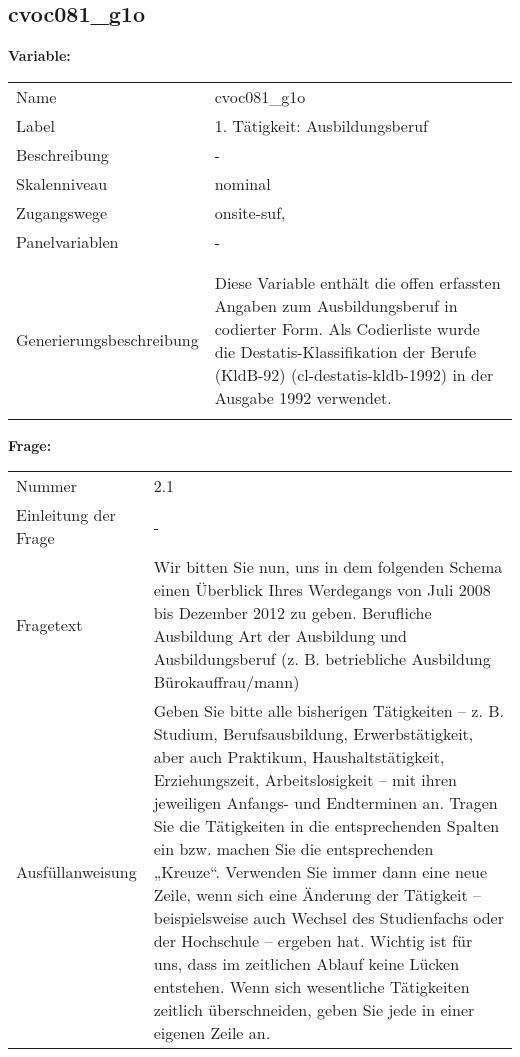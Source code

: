 	
	
	\subsection{cvoc081\_g1o}
	\label{subSection:cvoc081_g1o}

	\noindent\textbf{Variable:}\\
		\begin{tabular}{lL{11.3cm}}
			\label{tableVariable:cvoc081_g1o}
			Name & cvoc081\_g1o \\
			Label & 1. Tätigkeit: Ausbildungsberuf \\
			Beschreibung & - \\
			Skalenniveau & nominal \\
			Zugangswege &
				onsite-suf,
 \\
			Panelvariablen & -
			 \\
			 \\
 \\
					Generierungsbeschreibung & Diese Variable enthält die offen erfassten Angaben zum Ausbildungsberuf in codierter Form. Als Codierliste wurde die Destatis-Klassifikation der Berufe (KldB-92) (cl-destatis-kldb-1992) in der Ausgabe 1992 verwendet. 
				 \\	
			 \\
		\end{tabular}

		\vspace*{1 cm}
		\noindent\textbf{Frage:}\\
		\begin{tabular}{lL{11.3cm}}
			\label{tableQuestion:cvoc081_g1o}
			Nummer & 2.1 \\
			Einleitung der Frage & - \\
			Fragetext & Wir bitten Sie nun, uns in dem folgenden Schema einen Überblick Ihres Werdegangs von Juli 2008 bis Dezember 2012 zu geben.
Berufliche Ausbildung
Art der Ausbildung und Ausbildungsberuf
(z. B. betriebliche Ausbildung Bürokauffrau/mann) \\
			Ausfüllanweisung & Geben Sie bitte alle bisherigen Tätigkeiten – z. B. Studium, Berufsausbildung, Erwerbstätigkeit, aber auch Praktikum, Haushaltstätigkeit,
Erziehungszeit, Arbeitslosigkeit – mit ihren jeweiligen Anfangs- und Endterminen an. Tragen Sie die Tätigkeiten in die entsprechenden Spalten ein bzw. machen Sie die entsprechenden „Kreuze“. Verwenden Sie immer dann eine neue Zeile, wenn sich eine Änderung der Tätigkeit – beispielsweise auch Wechsel des Studienfachs oder der Hochschule – ergeben hat. Wichtig ist für uns, dass im zeitlichen Ablauf keine Lücken entstehen. Wenn sich wesentliche Tätigkeiten zeitlich überschneiden, geben Sie jede in einer eigenen Zeile an. \\
		\end{tabular}





